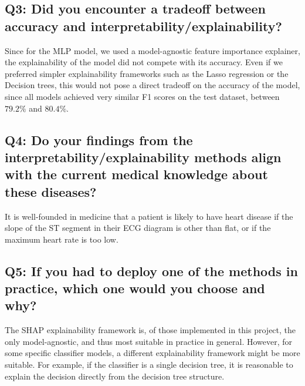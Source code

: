 \subsection*{Q3: Did you encounter a tradeoff between accuracy and interpretability/explainability?}
Since for the MLP model, we used a model-agnostic feature importance explainer, the explainability of the model did not compete with its accuracy. Even if we preferred simpler explainability frameworks such as the Lasso regression or the Decision trees, this would not pose a direct tradeoff on the accuracy of the model, since all models achieved very similar F1 scores on the test dataset, between $79.2\%$ and $80.4\%$.

\subsection*{Q4: Do your findings from the interpretability/explainability methods align with the current medical knowledge about these diseases?}
It is well-founded in medicine that a patient is likely to have heart disease if the slope of the ST segment in their ECG diagram is other than flat, or if the maximum heart rate is too low.

\subsection*{Q5: If you had to deploy one of the methods in practice, which one would you choose and why?}
The SHAP explainability framework is, of those implemented in this project, the only model-agnostic, and thus most suitable in practice in general. However, for some specific classifier models, a different explainability framework might be more suitable. For example, if the classifier is a single decision tree, it is reasonable to explain the decision directly from the decision tree structure.
